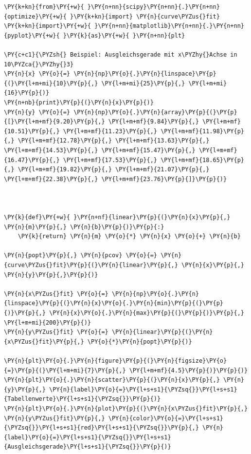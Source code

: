     \begin{tcolorbox}[breakable, size=fbox, boxrule=1pt, pad at break*=1mm,colback=cellbackground, colframe=cellborder]
\begin{Verbatim}[commandchars=\\\{\}]
\PY{k+kn}{from}\PY{+w}{ }\PY{n+nn}{scipy}\PY{n+nn}{.}\PY{n+nn}{optimize}\PY{+w}{ }\PY{k+kn}{import} \PY{n}{curve\PYZus{}fit}
\PY{k+kn}{import}\PY{+w}{ }\PY{n+nn}{matplotlib}\PY{n+nn}{.}\PY{n+nn}{pyplot}\PY{+w}{ }\PY{k}{as}\PY{+w}{ }\PY{n+nn}{plt}

\PY{c+c1}{\PYZsh{} Beispiel: Ausgleichsgerade mit x\PYZhy{}Achse in 10\PYZca{}\PYZhy{}3}
\PY{n}{x} \PY{o}{=} \PY{n}{np}\PY{o}{.}\PY{n}{linspace}\PY{p}{(}\PY{l+m+mi}{10}\PY{p}{,} \PY{l+m+mi}{25}\PY{p}{,} \PY{l+m+mi}{16}\PY{p}{)}
\PY{n+nb}{print}\PY{p}{(}\PY{n}{x}\PY{p}{)}
\PY{n}{y} \PY{o}{=} \PY{n}{np}\PY{o}{.}\PY{n}{array}\PY{p}{(}\PY{p}{[}\PY{l+m+mf}{9.20}\PY{p}{,} \PY{l+m+mf}{9.84}\PY{p}{,} \PY{l+m+mf}{10.51}\PY{p}{,} \PY{l+m+mf}{11.23}\PY{p}{,} \PY{l+m+mf}{11.98}\PY{p}{,} \PY{l+m+mf}{12.78}\PY{p}{,} \PY{l+m+mf}{13.63}\PY{p}{,} \PY{l+m+mf}{14.53}\PY{p}{,} \PY{l+m+mf}{15.47}\PY{p}{,} \PY{l+m+mf}{16.47}\PY{p}{,} \PY{l+m+mf}{17.53}\PY{p}{,} \PY{l+m+mf}{18.65}\PY{p}{,} \PY{l+m+mf}{19.82}\PY{p}{,} \PY{l+m+mf}{21.07}\PY{p}{,} \PY{l+m+mf}{22.38}\PY{p}{,} \PY{l+m+mf}{23.76}\PY{p}{]}\PY{p}{)}



\PY{k}{def}\PY{+w}{ }\PY{n+nf}{linear}\PY{p}{(}\PY{n}{x}\PY{p}{,} \PY{n}{m}\PY{p}{,} \PY{n}{b}\PY{p}{)}\PY{p}{:}
    \PY{k}{return} \PY{n}{m} \PY{o}{*} \PY{n}{x} \PY{o}{+} \PY{n}{b}

\PY{n}{popt}\PY{p}{,} \PY{n}{pcov} \PY{o}{=} \PY{n}{curve\PYZus{}fit}\PY{p}{(}\PY{n}{linear}\PY{p}{,} \PY{n}{x}\PY{p}{,} \PY{n}{y}\PY{p}{,}\PY{p}{)}

\PY{n}{x\PYZus{}fit} \PY{o}{=} \PY{n}{np}\PY{o}{.}\PY{n}{linspace}\PY{p}{(}\PY{n}{x}\PY{o}{.}\PY{n}{min}\PY{p}{(}\PY{p}{)}\PY{p}{,} \PY{n}{x}\PY{o}{.}\PY{n}{max}\PY{p}{(}\PY{p}{)}\PY{p}{,} \PY{l+m+mi}{200}\PY{p}{)}
\PY{n}{y\PYZus{}fit} \PY{o}{=} \PY{n}{linear}\PY{p}{(}\PY{n}{x\PYZus{}fit}\PY{p}{,} \PY{o}{*}\PY{n}{popt}\PY{p}{)}

\PY{n}{plt}\PY{o}{.}\PY{n}{figure}\PY{p}{(}\PY{n}{figsize}\PY{o}{=}\PY{p}{(}\PY{l+m+mi}{7}\PY{p}{,} \PY{l+m+mf}{4.5}\PY{p}{)}\PY{p}{)}
\PY{n}{plt}\PY{o}{.}\PY{n}{scatter}\PY{p}{(}\PY{n}{x}\PY{p}{,} \PY{n}{y}\PY{p}{,} \PY{n}{label}\PY{o}{=}\PY{l+s+s1}{\PYZsq{}}\PY{l+s+s1}{Tabellenwerte}\PY{l+s+s1}{\PYZsq{}}\PY{p}{)}
\PY{n}{plt}\PY{o}{.}\PY{n}{plot}\PY{p}{(}\PY{n}{x\PYZus{}fit}\PY{p}{,} \PY{n}{y\PYZus{}fit}\PY{p}{,} \PY{n}{color}\PY{o}{=}\PY{l+s+s1}{\PYZsq{}}\PY{l+s+s1}{red}\PY{l+s+s1}{\PYZsq{}}\PY{p}{,} \PY{n}{label}\PY{o}{=}\PY{l+s+s1}{\PYZsq{}}\PY{l+s+s1}{Ausgleichsgerade}\PY{l+s+s1}{\PYZsq{}}\PY{p}{)}


\end{Verbatim}
\end{tcolorbox}
